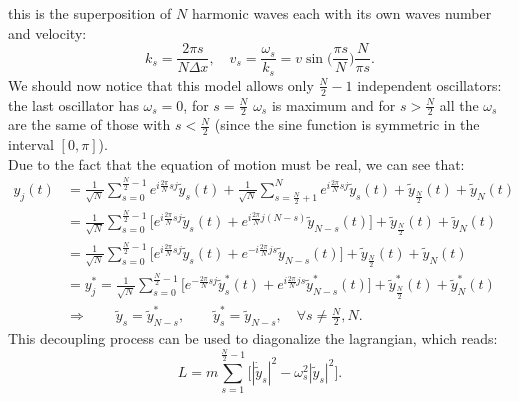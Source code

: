this is the superposition of $N$ harmonic waves each with its own waves number and velocity:
\begin{equation*}
    k_s=\frac{2\pi s }{N\Delta x},\quad v_s=\frac{\omega_s}{k_s}=v\sin\bigg(\frac{\pi s}{N}\bigg)\frac{N}{\pi s}.
\end{equation*}
We should now notice that this model allows only $\frac{N}{2}-1$ independent oscillators: the last oscillator has $\omega_s=0$, for $s=\frac{N}{2}$ $\omega_s$ is maximum and for $s>\frac{N}{2}$ all the $\omega_s$ are the same of those with $s<\frac{N}{2}$ (since the sine function is symmetric in the interval $[0,\pi]$).\\Due to the fact that the equation of motion must be real, we can see that:
\begin{align*}
    y_j(t)&=\frac{1}{\sqrt{N}}\sum_{s=0}^{\frac{N}{2}-1}e^{i\frac{2\pi}{N}sj} \tilde{y}_s(t)+\frac{1}{\sqrt{N}}\sum_{s=\frac{N}{2}+1}^{N}e^{i\frac{2\pi}{N}sj} \tilde{y}_s(t)+\tilde{y}_\frac{N}{2}(t)+\tilde{y}_N(t)\\&=\frac{1}{\sqrt{N}}\sum_{s=0}^{\frac{N}{2}-1}\bigg[ e^{i\frac{2\pi}{N}sj} \tilde{y}_s(t)+e^{i\frac{2\pi}{N}j(N-s)} \tilde{y}_{N-s}(t)\bigg]
   +\tilde{y}_\frac{N}{2}(t)+\tilde{y}_N(t)\\&=\frac{1}{\sqrt{N}}\sum_{s=0}^{\frac{N}{2}-1}\bigg[ e^{i\frac{2\pi}{N}sj} \tilde{y}_s(t)+e^{-i\frac{2\pi}{N}js} \tilde{y}_{N-s}(t)\bigg]
   +\tilde{y}_\frac{N}{2}(t)+\tilde{y}_N(t)\\&=y_j^*=\frac{1}{\sqrt{N}}\sum_{s=0}^{\frac{N}{2}-1}\bigg[ e^{-\frac{2\pi}{N}sj} \tilde{y}^*_s(t)+e^{i\frac{2\pi}{N}js} \tilde{y}^*_{N-s}(t)\bigg]
   +\tilde{y}^*_\frac{N}{2}(t)+\tilde{y}^*_N(t)\\
   &\Rightarrow\qquad \tilde y_s=\tilde y_{N-s}^*,\qquad \tilde y_s^*=\tilde y_{N-s}, \quad \forall s\neq\frac{N}{2},N.
\end{align*}
This decoupling process can be used to diagonalize the lagrangian, which reads:
\begin{equation*}
    L=m\sum_{s=1}^{\frac{N}{2}-1}\bigg[|\dot{\tilde{y}}_s|^2-\omega_s^2|\tilde{y}_s|^2\bigg].
\end{equation*}

